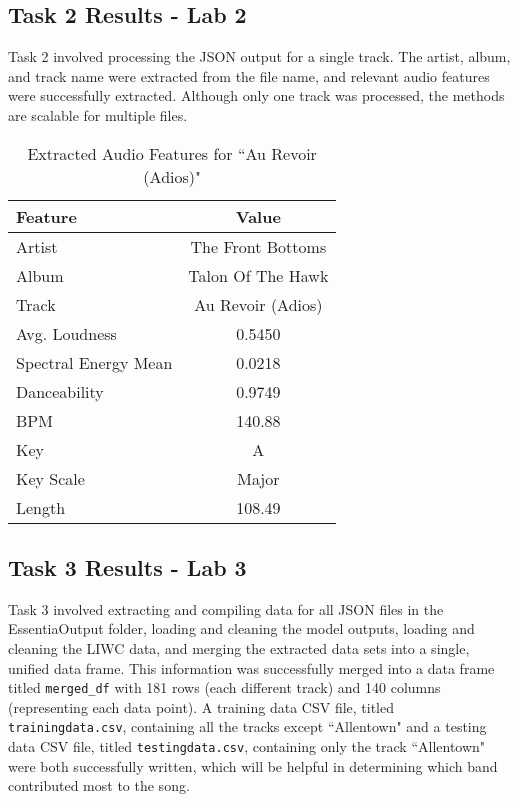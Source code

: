 \documentclass{article}\usepackage[]{graphicx}\usepackage[]{xcolor}
\begin{document}
\begin{multicols}{2}
\subsection{Task 2 Results - Lab 2}
Task 2 involved processing the JSON output for a single track. The artist, album, and track name were extracted from the file name, and relevant audio features were successfully extracted. Although only one track was processed, the methods are scalable for multiple files.

\begin{table}[H]
    \centering
    \begin{tabular}{|l|c|}
        \hline
        \textbf{Feature} & \textbf{Value} \\
        \hline
        Artist & The Front Bottoms \\
        Album & Talon Of The Hawk \\
        Track & Au Revoir (Adios) \\
        Avg. Loudness & 0.5450 \\
        Spectral Energy Mean & 0.0218 \\
        Danceability & 0.9749 \\
        BPM & 140.88 \\
        Key & A \\
        Key Scale & Major \\
        Length & 108.49 \\
        \hline
    \end{tabular}
    \caption{Extracted Audio Features for ``Au Revoir (Adios)"}
    \label{tab:audio_features}
\end{table}

\columnbreak

\subsection{Task 3 Results - Lab 3}
Task 3 involved extracting and compiling data for all JSON files in the EssentiaOutput folder, loading and cleaning the model outputs, loading and cleaning the LIWC data, and merging the extracted data sets into a single, unified data frame. This information was successfully merged into a data frame titled \texttt{merged\_df} with 181 rows (each different track) and 140 columns (representing each data point). A training data CSV file, titled \texttt{trainingdata.csv}, containing all the tracks except ``Allentown" and a testing data CSV file, titled \texttt{testingdata.csv}, containing only the track ``Allentown" were both successfully written, which will be helpful in determining which band contributed most to the song. 



\end{multicols}
\end{document}
